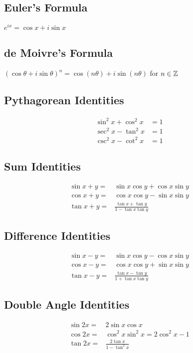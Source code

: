 \begin{multicols}{2}

\subsection{Euler's Formula}
$e^{ix} = \cos{x} + i\sin{x}$

\subsection{de Moivre's Formula}
$(\cos{\theta} + i\sin{\theta})^n = \cos{(n\theta)} + i\sin{(n\theta)}$ for $n \in \mathbb{Z}$

\subsection{Pythagorean Identities}
$$\begin{aligned}
\sin^2{x}+\cos^2{x}&= 1\\
\sec^2{x}-\tan^2{x}&= 1\\
\csc^2{x}-\cot^2{x}&= 1
\end{aligned}$$

\subsection{Sum Identities}
$$\begin{aligned}
\sin{x+y}=&\sin{x}\cos{y} + \cos{x}\sin{y}\\
\cos{x+y}=&\cos{x}\cos{y} - \sin{x}\sin{y}\\
\tan{x+y}=&\frac{\tan{x}+\tan{y}}{1-\tan{x}\tan{y}}
\end{aligned}$$

\subsection{Difference Identities}
\begin{align*}
\sin{x-y}=&\sin{x}\cos{y} - \cos{x}\sin{y}\\
\cos{x-y}=&\cos{x}\cos{y} + \sin{x}\sin{y}\\
\tan{x-y}=&\frac{\tan{x}-\tan{y}}{1+\tan{x}\tan{y}}
\end{align*}

\subsection{Double Angle Identities}
\begin{align*}
\sin{2x}=&2\sin{x}\cos{x}\\
\cos{2x}=&\cos^{2}{x}\sin^{2}{x}=2\cos^{2}{x} - 1\\
\tan{2x}=&\frac{2\tan{x}}{1-\tan^{2}{x}}
\end{align*}


\end{multicols}
